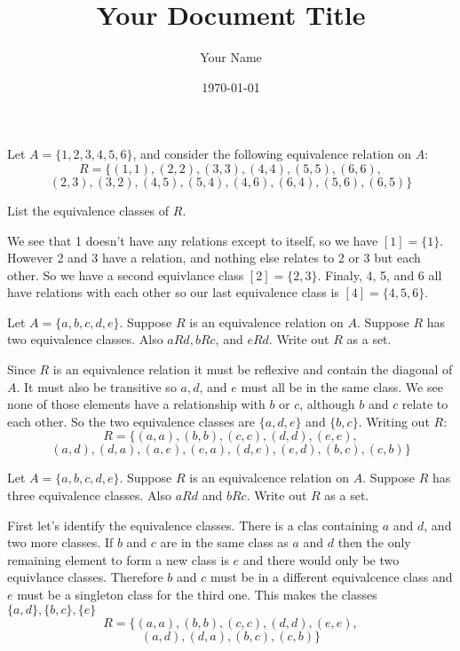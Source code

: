 \documentclass{article}
\title{Your Document Title}
\author{Your Name}
\date{\today} %
\begin{document}
\maketitle

\begin{problem}
Let $A = \{1, 2, 3, 4, 5, 6\}$, and consider the following equivalence relation on $A$:
$$R = \{(1, 1), (2, 2), (3, 3), (4, 4), (5, 5), (6, 6),$$
$$(2, 3), (3, 2), (4, 5), (5, 4), (4, 6), (6, 4), (5, 6), (6, 5)\}$$

List the equivalence classes of $R$.
\end{problem}

We see that 1 doesn't have any relations except to itself, so we have $[1] = \{1\}$. However 2 and 3 have a relation, and nothing else relates to 2 or 3 but each other. So we have a second equivlance class $[2] = \{2, 3\}$. Finaly, 4, 5, and 6 all have relations with each other so our last equivalence class is $[4] = \{4, 5, 6\}$.

\begin{problem}
Let $A = \{a, b, c, d, e\}$. Suppose $R$ is an equivalence relation on $A$. Suppose $R$ has two equivalence classes. Also $aRd, bRc$, and $eRd$. Write out $R$ as a set.
\end{problem}

Since $R$ is an equivalence relation it must be reflexive and contain the diagonal of $A$. It must also be transitive so $a, d$, and $e$ must all be in the same class. We see none of those elements have a relationship with $b$ or $c$, although $b$ and $c$ relate to each other. So the two equivalence classes are $\{a, d, e\}$ and $\{b, c\}$. Writing out $R$:
$$R = \{(a, a), (b, b), (c, c), (d, d), (e, e), $$
$$(a, d), (d, a), (a, e), (e, a), (d, e), (e, d), (b, c), (c, b)\}$$

\begin{problem}
Let $A = \{a, b, c, d, e\}$. Suppose $R$ is an equivalcence relation on $A$. Suppose $R$ has three equivalence classes. Also $aRd$ and $bRc$. Write out $R$ as a set.
\end{problem}

First let's identify the equivalence classes. There is a clas containing $a$ and $d$, and two more classes. If $b$ and $c$ are in the same class as $a$ and $d$ then the only remaining element to form a new class is $e$ and there would only be two equivlance classes. Therefore $b$ and $c$ must be in a different equivalcence class and $e$ must be a singleton class for the third one. This makes the classes $\{a, d\}, \{b, c\}, \{e\}$
$$R = \{(a, a), (b, b), (c, c), (d, d), (e, e), $$
$$(a, d), (d, a), (b, c), (c, b)\}$$
\end{document}
